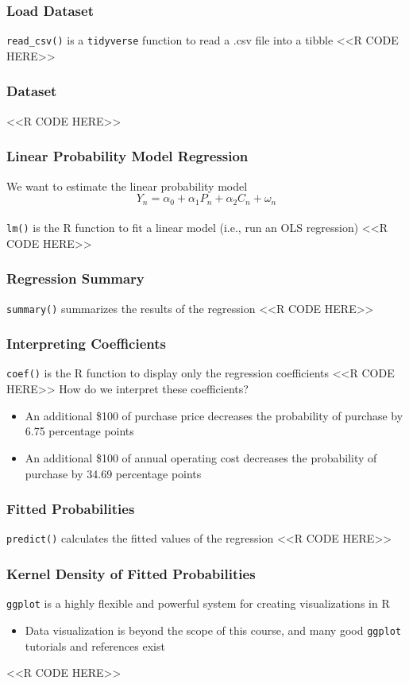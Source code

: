 \documentclass{beamer}
\begin{document}
\begin{frame}[fragile]\frametitle{Load Dataset}
    \texttt{read\_csv()} is a \texttt{tidyverse} function to read a .csv file into a tibble
    <<R CODE HERE>>
\end{frame}

\begin{frame}[fragile]\frametitle{Dataset}
    <<R CODE HERE>>
\end{frame}

\begin{frame}[fragile]\frametitle{Linear Probability Model Regression}
	We want to estimate the linear probability model
	$$Y_n = \alpha_0 + \alpha_1 P_n + \alpha_2 C_n + \omega_n$$ \\
	\vspace{3ex}
    \texttt{lm()} is the R function to fit a linear model (i.e., run an OLS regression)
    <<R CODE HERE>>
\end{frame}

\begin{frame}[fragile]\frametitle{Regression Summary}
    \texttt{summary()} summarizes the results of the regression
    \vspace{1ex}
    <<R CODE HERE>>
\end{frame}

\begin{frame}[fragile]\frametitle{Interpreting Coefficients}
    \texttt{coef()} is the R function to display only the regression coefficients
    <<R CODE HERE>>
    \vspace{2ex}
    How do we interpret these coefficients?
    \begin{itemize}
        \item An additional \$100 of purchase price decreases the probability of purchase by 6.75 percentage points
        \item An additional \$100 of annual operating cost decreases the probability of purchase by 34.69 percentage points
    \end{itemize}
\end{frame}

\begin{frame}[fragile]\frametitle{Fitted Probabilities}
    \texttt{predict()} calculates the fitted values of the regression
    <<R CODE HERE>>
\end{frame}

\begin{frame}[fragile]\frametitle{Kernel Density of Fitted Probabilities}
	\texttt{ggplot} is a highly flexible and powerful system for creating visualizations in R
	\begin{itemize}
		\item Data visualization is beyond the scope of this course, and many good \texttt{ggplot} tutorials and references exist
	\end{itemize}
    <<R CODE HERE>>
\end{frame}
\end{document}
